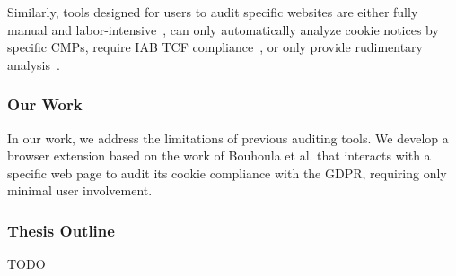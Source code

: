 Similarly, tools designed for users to audit specific websites are either fully manual and labor-intensive~\cite{gorin2024edpb}, can only automatically analyze cookie notices by specific CMPs, require IAB TCF compliance~\cite{matte2020cookiebannersrespectchoice}, or only provide rudimentary analysis~\cite{cookie_information2019cookie}.

\subsubsection{Our Work}
In our work, we address the limitations of previous auditing tools.
We develop a browser extension based on the work of Bouhoula et al. that interacts with a specific web page to audit its cookie compliance with the GDPR, requiring only minimal user involvement.

\subsubsection{Thesis Outline}
TODO
